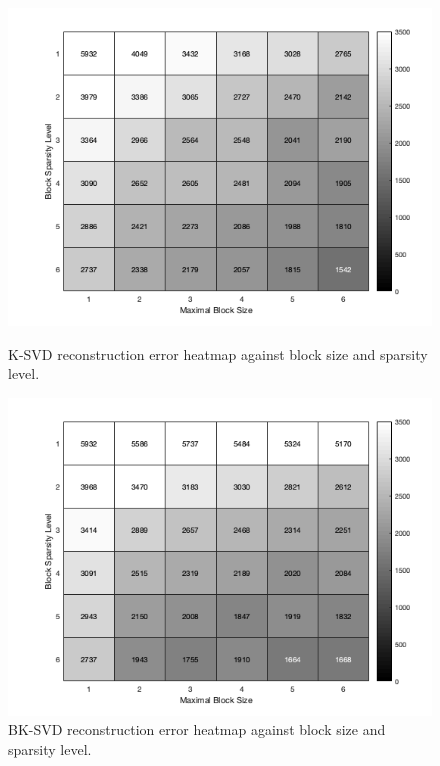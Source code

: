 \begin{figure}[!htbp]
\centering
\begin{minipage}[]{0.49\textwidth}
\includegraphics[width=\textwidth]{images/ksvd_heat.png}
\caption{K-SVD reconstruction error heatmap against block size and sparsity level.}
\label{HEAT1}
\end{minipage}
\begin{minipage}[]{0.49\textwidth}
\includegraphics[width=\textwidth]{images/bksvd_heat.png}
\caption{BK-SVD reconstruction error heatmap against block size and sparsity level.}
\label{HEAT2}
\end{minipage}
\end{figure}
